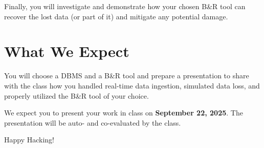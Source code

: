 \documentclass{article}
\begin{document}
Finally, you will investigate and demonstrate how your chosen B\&R tool can recover the lost data (or part of it) and mitigate any potential damage.

\section{What We Expect}
You will choose a DBMS and a B\&R tool and prepare a presentation to share with the class how you handled real-time data ingestion, simulated data loss, and properly utilized the B\&R tool of your choice.

We expect you to present your work in class on \textbf{September 22, 2025}. The presentation will be auto- and co-evaluated by the class.

\vspace{5mm}
Happy Hacking! 
\end{document}
